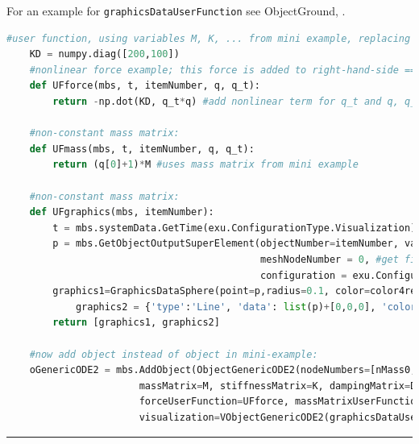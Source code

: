     For an example for \texttt{graphicsDataUserFunction} see ObjectGround, .
    \finishTable
    \userFunctionExample{}
    \pythonstyle
    \begin{lstlisting}[language=Python]
    #user function, using variables M, K, ... from mini example, replacing ObjectGenericODE2(...)
    KD = numpy.diag([200,100])
    #nonlinear force example; this force is added to right-hand-side ==> negative sign!
    def UFforce(mbs, t, itemNumber, q, q_t): 
        return -np.dot(KD, q_t*q) #add nonlinear term for q_t and q, q_t*q gives vector
    
    #non-constant mass matrix:
    def UFmass(mbs, t, itemNumber, q, q_t): 
        return (q[0]+1)*M #uses mass matrix from mini example
    
    #non-constant mass matrix:
    def UFgraphics(mbs, itemNumber):
        t = mbs.systemData.GetTime(exu.ConfigurationType.Visualization) #get time if needed
        p = mbs.GetObjectOutputSuperElement(objectNumber=itemNumber, variableType = exu.OutputVariableType.Position,
                                            meshNodeNumber = 0, #get first node's position 
                                            configuration = exu.ConfigurationType.Visualization)
        graphics1=GraphicsDataSphere(point=p,radius=0.1, color=color4red)
            graphics2 = {'type':'Line', 'data': list(p)+[0,0,0], 'color':color4blue}
        return [graphics1, graphics2] 

    #now add object instead of object in mini-example:
    oGenericODE2 = mbs.AddObject(ObjectGenericODE2(nodeNumbers=[nMass0,nMass1], 
                       massMatrix=M, stiffnessMatrix=K, dampingMatrix=D,
                       forceUserFunction=UFforce, massMatrixUserFunction=UFmass,
                       visualization=VObjectGenericODE2(graphicsDataUserFunction=UFgraphics)))
    \end{lstlisting}
\vspace{6pt}\par\noindent\rule{\textwidth}{0.4pt}
